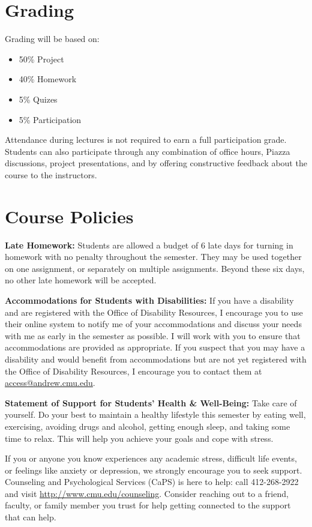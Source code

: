 \documentclass[11pt,letterpaper]{article}
\begin{document}
\section*{Grading}

Grading will be based on:
\begin{itemize}
	\item 50\% Project
	\item 40\% Homework
	\item 5\% Quizes
	\item 5\% Participation
\end{itemize}
Attendance during lectures is not required to earn a full participation grade. Students can also participate through any combination of office hours, Piazza discussions, project presentations, and by offering constructive feedback about the course to the instructors.


\section*{Course Policies}

\textbf{Late Homework:} Students are allowed a budget of 6 late days for turning in homework with no penalty throughout the semester. They may be used together on one assignment, or separately on multiple assignments. Beyond these six days, no other late homework will be accepted.

\medskip
\noindent
\textbf{Accommodations for Students with Disabilities:} If you have a disability and are registered with the Office of Disability Resources, I encourage you to use their online system to notify me of your accommodations and discuss your needs with me as early in the semester as possible. I will work with you to ensure that accommodations are provided as appropriate. If you suspect that you may have a disability and would benefit from accommodations but are not yet registered with the Office of Disability Resources, I encourage you to contact them at \href{mailto:access@andrew.cmu.edu}{access@andrew.cmu.edu}.

\medskip
\noindent
\textbf{Statement of Support for Students' Health \& Well-Being:} Take care of yourself. Do your best to maintain a healthy lifestyle this semester by eating well, exercising, avoiding drugs and alcohol, getting enough sleep, and taking some time to relax. This will help you achieve your goals and cope with stress.

\medskip
\noindent
If you or anyone you know experiences any academic stress, difficult life events, or feelings like anxiety or depression, we strongly encourage you to seek support. Counseling and Psychological Services (CaPS) is here to help: call 412-268-2922 and visit \href{http://www.cmu.edu/counseling}{http://www.cmu.edu/counseling}. Consider reaching out to a friend, faculty, or family member you trust for help getting connected to the support that can help.
\end{document}
